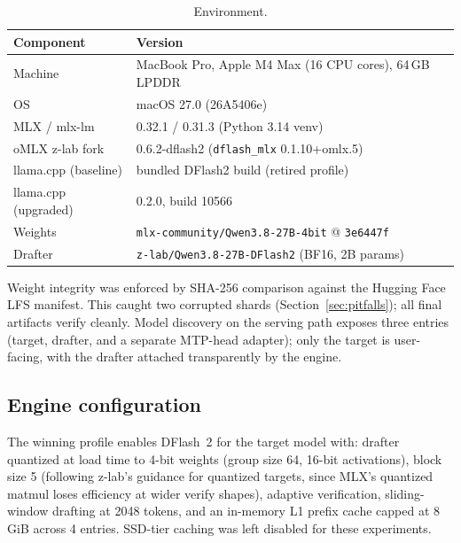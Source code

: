 \documentclass[11pt]{article}
\newcommand{\dflash}{DFlash~2}
\newcommand{\omlx}{oMLX}
\begin{document}
\begin{table}[h]
\centering
\caption{Environment.}
\label{tab:env}
\small
\begin{tabular}{ll}
\toprule
Component & Version \\
\midrule
Machine & MacBook Pro, Apple M4 Max (16 CPU cores), 64\,GB LPDDR \\
OS & macOS 27.0 (26A5406e) \\
MLX / mlx-lm & 0.32.1 / 0.31.3 (Python 3.14 venv) \\
\omlx{} z-lab fork & 0.6.2-dflash2 (\texttt{dflash\_mlx} 0.1.10+omlx.5) \\
llama.cpp (baseline) & bundled DFlash2 build (retired profile) \\
llama.cpp (upgraded) & 0.2.0, build 10566 \\
Weights & \texttt{mlx-community/Qwen3.8-27B-4bit} @ \texttt{3e6447f} \\
Drafter & \texttt{z-lab/Qwen3.8-27B-DFlash2} (BF16, 2B params) \\
\bottomrule
\end{tabular}
\end{table}

Weight integrity was enforced by SHA-256 comparison against the Hugging Face
LFS manifest. This caught two corrupted shards (Section~\ref{sec:pitfalls});
all final artifacts verify cleanly. Model discovery on the serving path exposes
three entries (target, drafter, and a separate MTP-head adapter); only the
target is user-facing, with the drafter attached transparently by the engine.

\subsection{Engine configuration}
The winning profile enables \dflash{} for the target model with: drafter
quantized at load time to 4-bit weights (group size 64, 16-bit activations),
block size 5 (following z-lab's guidance for quantized targets, since MLX's
quantized matmul loses efficiency at wider verify shapes), adaptive
verification, sliding-window drafting at 2048 tokens, and an in-memory L1
prefix cache capped at 8\,GiB across 4 entries. SSD-tier caching was left
disabled for these experiments.
\end{document}
